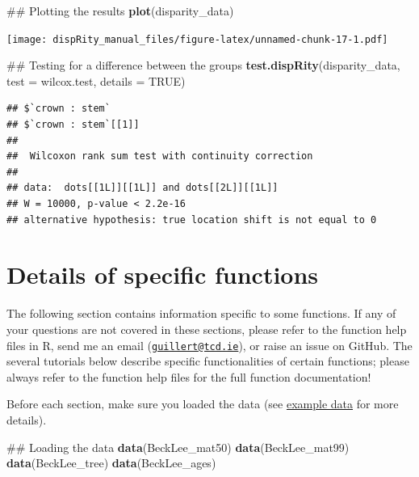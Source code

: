 \documentclass[]{book}
\newenvironment{Shaded}{\begin{snugshade}}{\end{snugshade}}
\newcommand{\KeywordTok}[1]{\textcolor[rgb]{0.13,0.29,0.53}{\textbf{#1}}}
\newcommand{\DataTypeTok}[1]{\textcolor[rgb]{0.13,0.29,0.53}{#1}}
\newcommand{\OtherTok}[1]{\textcolor[rgb]{0.56,0.35,0.01}{#1}}
\newcommand{\NormalTok}[1]{#1}
\theoremstyle{definition}
\theoremstyle{definition}
\theoremstyle{definition}
\theoremstyle{remark}
\begin{document}
\begin{Shaded}
\begin{Highlighting}[]
\NormalTok{## Plotting the results}
\KeywordTok{plot}\NormalTok{(disparity_data)}
\end{Highlighting}
\end{Shaded}

\texttt{[image: dispRity\_manual\_files/figure-latex/unnamed-chunk-17-1.pdf]}

\begin{Shaded}
\begin{Highlighting}[]
\NormalTok{## Testing for a difference between the groups}
\KeywordTok{test.dispRity}\NormalTok{(disparity_data, }\DataTypeTok{test =}\NormalTok{ wilcox.test, }\DataTypeTok{details =} \OtherTok{TRUE}\NormalTok{)}
\end{Highlighting}
\end{Shaded}

\begin{verbatim}
## $`crown : stem`
## $`crown : stem`[[1]]
## 
##  Wilcoxon rank sum test with continuity correction
## 
## data:  dots[[1L]][[1L]] and dots[[2L]][[1L]]
## W = 10000, p-value < 2.2e-16
## alternative hypothesis: true location shift is not equal to 0
\end{verbatim}

\chapter{Details of specific
functions}\label{details-of-specific-functions}

The following section contains information specific to some functions.
If any of your questions are not covered in these sections, please refer
to the function help files in R, send me an email
(\href{mailto:guillert@tcd.ie}{\nolinkurl{guillert@tcd.ie}}), or raise
an issue on GitHub. The several tutorials below describe specific
functionalities of certain functions; please always refer to the
function help files for the full function documentation!

Before each section, make sure you loaded the \citet{beckancient2014}
data (see \protect\hyperlink{example-data}{example data} for more
details).

\begin{Shaded}
\begin{Highlighting}[]
\NormalTok{## Loading the data}
\KeywordTok{data}\NormalTok{(BeckLee_mat50)}
\KeywordTok{data}\NormalTok{(BeckLee_mat99)}
\KeywordTok{data}\NormalTok{(BeckLee_tree)}
\KeywordTok{data}\NormalTok{(BeckLee_ages)}
\end{Highlighting}
\end{Shaded}
\end{document}
